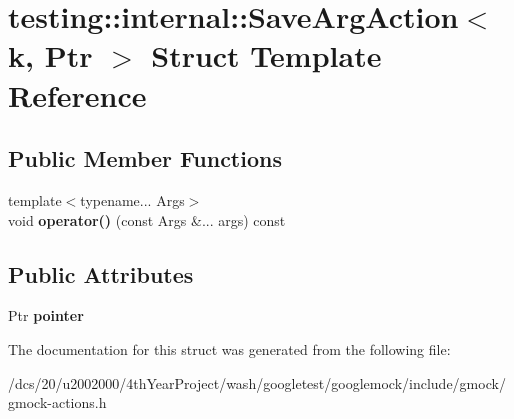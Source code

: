 \hypertarget{structtesting_1_1internal_1_1SaveArgAction}{}\section{testing\+:\+:internal\+:\+:Save\+Arg\+Action$<$ k, Ptr $>$ Struct Template Reference}
\label{structtesting_1_1internal_1_1SaveArgAction}
\subsection*{Public Member Functions}
\begin{DoxyCompactItemize}
\item 
\mbox{\label{structtesting_1_1internal_1_1SaveArgAction_a324f040f0ad4a9cef6e081fda7d5e7bd}} 
{\footnotesize template$<$typename... Args$>$ }\\void {\bfseries operator()} (const Args \&... args) const
\end{DoxyCompactItemize}
\subsection*{Public Attributes}
\begin{DoxyCompactItemize}
\item 
\mbox{\label{structtesting_1_1internal_1_1SaveArgAction_a04bd275b772ee2aa4b71ccbff3c7d766}} 
Ptr {\bfseries pointer}
\end{DoxyCompactItemize}


The documentation for this struct was generated from the following file\+:\begin{DoxyCompactItemize}
\item 
/dcs/20/u2002000/4th\+Year\+Project/wash/googletest/googlemock/include/gmock/gmock-\/actions.\+h\end{DoxyCompactItemize}
